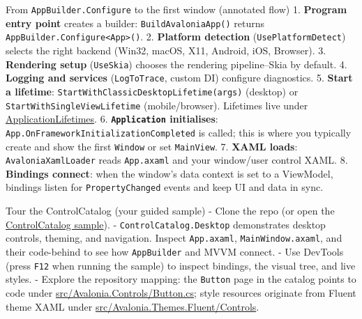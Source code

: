 From \passthrough{\lstinline!AppBuilder.Configure!} to the first window
(annotated flow) 1. \textbf{Program entry point} creates a builder:
\passthrough{\lstinline!BuildAvaloniaApp()!} returns
\passthrough{\lstinline!AppBuilder.Configure<App>()!}. 2.
\textbf{Platform detection}
(\passthrough{\lstinline!UsePlatformDetect!}) selects the right backend
(Win32, macOS, X11, Android, iOS, Browser). 3. \textbf{Rendering setup}
(\passthrough{\lstinline!UseSkia!}) chooses the rendering pipeline--Skia
by default. 4. \textbf{Logging and services}
(\passthrough{\lstinline!LogToTrace!}, custom DI) configure diagnostics.
5. \textbf{Start a lifetime}:
\passthrough{\lstinline!StartWithClassicDesktopLifetime(args)!}
(desktop) or \passthrough{\lstinline!StartWithSingleViewLifetime!}
(mobile/browser). Lifetimes live under
\href{https://github.com/AvaloniaUI/Avalonia/tree/master/src/Avalonia.Controls/ApplicationLifetimes}{ApplicationLifetimes}.
6. \textbf{\passthrough{\lstinline!Application!} initialises}:
\passthrough{\lstinline!App.OnFrameworkInitializationCompleted!} is
called; this is where you typically create and show the first
\passthrough{\lstinline!Window!} or set
\passthrough{\lstinline!MainView!}. 7. \textbf{XAML loads}:
\passthrough{\lstinline!AvaloniaXamlLoader!} reads
\passthrough{\lstinline!App.axaml!} and your window/user control XAML.
8. \textbf{Bindings connect}: when the window's data context is set to a
ViewModel, bindings listen for \passthrough{\lstinline!PropertyChanged!}
events and keep UI and data in sync.

Tour the ControlCatalog (your guided sample) - Clone the repo (or open
the
\href{https://github.com/AvaloniaUI/Avalonia/tree/master/samples/ControlCatalog}{ControlCatalog
sample}). - \passthrough{\lstinline!ControlCatalog.Desktop!}
demonstrates desktop controls, theming, and navigation. Inspect
\passthrough{\lstinline!App.axaml!},
\passthrough{\lstinline!MainWindow.axaml!}, and their code-behind to see
how \passthrough{\lstinline!AppBuilder!} and MVVM connect. - Use
DevTools (press \passthrough{\lstinline!F12!} when running the sample)
to inspect bindings, the visual tree, and live styles. - Explore the
repository mapping: the \passthrough{\lstinline!Button!} page in the
catalog points to code under
\href{https://github.com/AvaloniaUI/Avalonia/blob/master/src/Avalonia.Controls/Button.cs}{src/Avalonia.Controls/Button.cs};
style resources originate from Fluent theme XAML under
\href{https://github.com/AvaloniaUI/Avalonia/tree/master/src/Avalonia.Themes.Fluent/Controls}{src/Avalonia.Themes.Fluent/Controls}.

